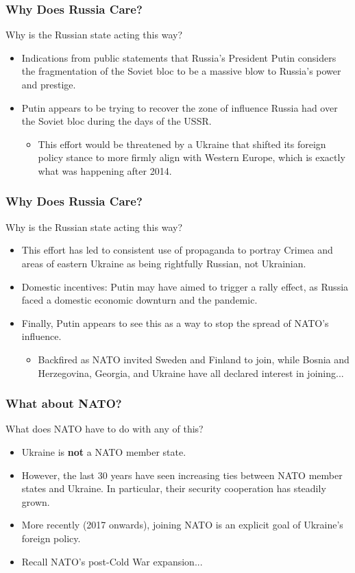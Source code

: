 \documentclass[handout]{beamer}
\begin{document}
\begin{frame} 
	\frametitle{\LARGE{Why Does Russia Care?}}
	Why is the Russian state acting this way?
	\begin{itemize}
		\item Indications from public statements that Russia's President Putin considers the fragmentation of the Soviet bloc to be a massive blow to Russia's power and prestige. \pause
		\item Putin appears to be trying to recover the zone of influence Russia had over the Soviet bloc during the days of the USSR. \pause
		\begin{itemize}
			\item This effort would be threatened by a Ukraine that shifted its foreign policy stance to more firmly align with Western Europe, which is exactly what was happening after 2014.
		\end{itemize}
	\end{itemize}
\end{frame}

\begin{frame} 
	\frametitle{\LARGE{Why Does Russia Care?}}
	Why is the Russian state acting this way?
	\begin{itemize}
		\item This effort has led to consistent use of propaganda to portray Crimea and areas of eastern Ukraine as being rightfully Russian, not Ukrainian. \pause
		\item Domestic incentives: Putin may have aimed to trigger a rally effect, as Russia faced a domestic economic downturn and the pandemic. \pause
		\item Finally, Putin appears to see this as a way to stop the spread of NATO's influence. \pause
		\begin{itemize}
			\item Backfired as NATO invited Sweden and Finland to join, while Bosnia and Herzegovina, Georgia, and Ukraine have all declared interest in joining...
		\end{itemize}
	\end{itemize}
\end{frame}

\begin{frame} 
	\frametitle{\LARGE{What about NATO?}}
	What does NATO have to do with any of this?
	\begin{itemize}
		\item Ukraine is \textbf{not} a NATO member state. \pause
		\item However, the last 30 years have seen increasing ties between NATO member states and Ukraine. In particular, their security cooperation has steadily grown. \pause
		\item More recently (2017 onwards), joining NATO is an explicit goal of Ukraine's foreign policy.
		\item Recall NATO's post-Cold War expansion...
	\end{itemize}
\end{frame}
\end{document}
